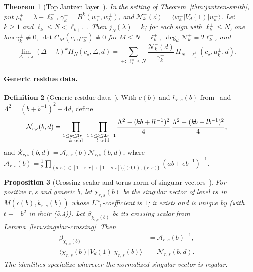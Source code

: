\documentclass[twoside,10pt]{article}
\numberwithin{equation}{section}
\theoremstyle{slbody}
\newtheorem{theorem}{Theorem}[section]
\newtheorem{proposition}[theorem]{Proposition}
\theoremstyle{definition}
\newtheorem{definition}[theorem]{Definition}
\theoremstyle{remark}
\begin{document}
\begin{theorem}[Top Jantzen layer~{\cite[Theorem~8.2]{PolzerColliding2026}}]\label{thm:top-layer}
In the setting of Theorem~\ref{thm:jantzen-smith}, put
\(\mu^\pm_k=\lambda+\ell^\pm_k\),
\(\gamma^\pm_k=B^k(w^\pm_k,w^\pm_k)\), and
\(\mathcal N^\pm_k(d)=\langle w^\pm_k|V_d(1)|w^\pm_k\rangle\).
Let \(k\geq1\) and \(\ell_k\leq N<\ell_{k+1}\).  Then \(j_N(\lambda)=k\);
for each sign with \(\ell^\pm_k\leq N\), one has \(\gamma^\pm_k\neq0\),
\(\det G_M(c_\star,\mu^\pm_k)\neq0\) for \(M\leq N-\ell^\pm_k\),
\(\deg_d\mathcal N^\pm_k=2\ell^\pm_k\), and
\begin{equation}\label{eq:top-layer}
 \lim_{\Delta\to\lambda}(\Delta-\lambda)^kH_N(c_\star,\Delta,d)
 =\sum_{\pm:\ \ell^\pm_k\leq N}\frac{\mathcal N^\pm_k(d)}{\gamma^\pm_k}\,
 H_{N-\ell^\pm_k}(c_\star,\mu^\pm_k,d).
\end{equation}
\end{theorem}

\paragraph{Generic residue data.}

\begin{definition}[Generic residue data~{\cite[Definition~6.1]{PolzerColliding2026}}]
\label{def:generic-residue}
With \(c(b)\) and \(h_{r,s}(b)\) from~\cite[Definition~3.1]{PolzerColliding2026}
and \(\Lambda^2=(b+b^{-1})^2-4d\), define
\[
 {\mathcal N}_{r,s}(b,d)
 =\prod_{\substack{1\leq k\leq2r-1\\k\ {\rm odd}}}
  \prod_{\substack{1\leq l\leq2s-1\\l\ {\rm odd}}}
 \frac{\Lambda^2-(kb+lb^{-1})^2}{4}\,
 \frac{\Lambda^2-(kb-lb^{-1})^2}{4},
\]
and \({\mathcal R}_{r,s}(b,d)={\mathcal A}_{r,s}(b){\mathcal N}_{r,s}(b,d)\),
where
\({\mathcal A}_{r,s}(b)=\frac12\prod_{(a,e)\in[1-r,r]\times[1-s,s]\setminus\{(0,0),(r,s)\}}(ab+eb^{-1})^{-1}\).
\end{definition}

\begin{proposition}[Crossing scalar and torus norm of singular vectors~{\cite[Proposition~6.2]{PolzerColliding2026}}]
\label{prop:imported-normalizations}
For positive \(r,s\) and generic \(b\), let \(\chi_{r,s}(b)\) be the
singular vector of level \(rs\) in \(M(c(b),h_{r,s}(b))\) whose
\(L_{-1}^{rs}\)-coefficient is \(1\); it exists and is unique by
\cite[Propositions~5.1, 5.2 and Corollary~5.2]{IoharaKoga2011}
(with \(t=-b^2\) in their (5.4)).  Let
\(\beta_{\chi_{r,s}(b)}\) be its crossing scalar from
Lemma~\ref{lem:singular-crossing}.  Then
\begin{align}
 \beta_{\chi_{r,s}(b)}&={\mathcal A}_{r,s}(b)^{-1},\label{eq:crossing-normalization}\\
 \langle\chi_{r,s}(b)|V_d(1)|\chi_{r,s}(b)\rangle&={\mathcal N}_{r,s}(b,d).\label{eq:fusion-normalization}
\end{align}
The identities specialize wherever the normalized singular vector is regular.
\end{proposition}
\end{document}
